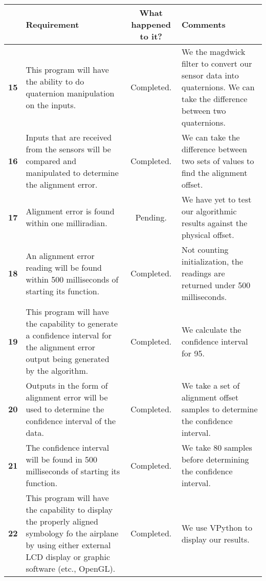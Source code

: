 \hfill \break
\begin{center}
\begin{tabular}{|c|p{5cm}|c|p{5cm}|}
\hline
\textbf{} & \textbf{Requirement} & \textbf{What happened to it?} & \textbf{Comments} \\ \hline

\textbf{15}
& This program will have the ability to do quaternion manipulation on the inputs.
& Completed.
& We the magdwick filter to convert our sensor data into quaternions. We can take the difference between two quaternions.
\\ \hline

\textbf{16}
& Inputs that are received from the sensors will be compared and manipulated to determine the alignment error.
& Completed.
& We can take the difference between two sets of values to find the alignment offset.
\\ \hline
 
\textbf{17}
& Alignment error is found within one milliradian.
& Pending.
& We have yet to test our algorithmic results against the physical offset.
\\ \hline
 
\textbf{18}
& An alignment error reading will be found within 500 milliseconds of starting its function.
& Completed.
& Not counting initialization, the readings are returned under 500 milliseconds.
\\ \hline
 
\textbf{19}
& This program will have the capability to generate a confidence interval for the alignment error output being generated by the algorithm.
& Completed.
& We calculate the confidence interval for 95.
\\ \hline
 
\textbf{20}
& Outputs in the form of alignment error will be used to determine the confidence interval of the data.
& Completed.
& We take a set of alignment offset samples to determine the confidence interval.
\\ \hline
 
\textbf{21}
& The confidence interval will be found in 500 milliseconds of starting its function.
& Completed.
& We take 80 samples before determining the confidence interval.
\\ \hline
 
\textbf{22}
& This program will have the capability to display the properly aligned symbology fo the airplane by using either external LCD display or graphic software (etc., OpenGL).
& Completed.
& We use VPython to display our results.
\\ \hline
 

\end{tabular}
\end{center}
